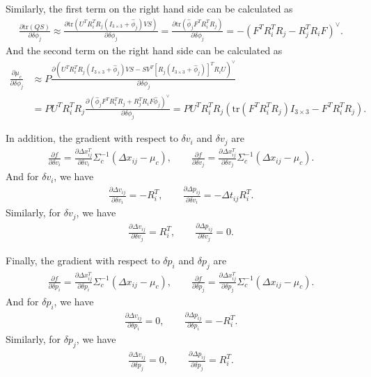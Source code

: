 \documentclass[10pt]{article}
\newcommand{\tr}[1]{\ensuremath{\mathrm{tr}\left( #1 \right)}}
\begin{document}
\color{black}
Similarly, the first term on the right hand side can be calculated as
\begin{align}
	\frac{\partial \tr{QS}}{\partial \delta\phi_j} \approx \frac{\partial \tr{U^TR_i^TR_j(I_{3\times 3}+\hat{\phi}_j)VS}}{\partial \delta\phi_j} = \frac{\partial \tr{\hat{\phi}_jF^TR_i^TR_j}}{\partial \delta\phi_j} = -(F^TR_i^TR_j - R_j^TR_iF)^\vee.
\end{align}
And the second term on the right hand side can be calculated as
\begin{align}
	\frac{\partial \mu_c}{\partial \delta\phi_j} &\approx P\frac{\partial \left(U^TR_i^TR_j(I_{3\times 3}+\hat{\phi}_j)VS - SV^T[R_j(I_{3\times 3}+\hat{\phi}_j)]^TR_iU\right)^\vee}{\partial \delta\phi_j} \nonumber \\
	&= PU^TR_i^TR_j \frac{\partial \left(\hat{\phi}_jF^TR_i^TR_j + R_j^TR_iF\hat{\phi}_j\right)^\vee}{\partial \delta\phi_j} = PU^TR_i^TR_j \left(\tr{F^TR_i^TR_j}I_{3\times 3} - F^TR_i^TR_j\right).
\end{align}

In addition, the gradient with respect to $\delta v_i$ and $\delta v_j$ are
\color{blue}
\begin{align}
	\frac{\partial f}{\partial \delta v_i} = \frac{\partial \Delta x_{ij}^T}{\partial \delta v_i} \Sigma_c^{-1} (\Delta x_{ij}-\mu_c), \qquad \frac{\partial f}{\partial \delta v_j} = \frac{\partial \Delta x_{ij}^T}{\partial \delta v_j} \Sigma_c^{-1} (\Delta x_{ij}-\mu_c).
\end{align}
\color{black}
And for $\delta v_i$, we have
\begin{align}
	\frac{\partial \Delta v_{ij}}{\partial \delta v_i} = -R_i^T, \qquad \frac{\partial \Delta p_{ij}}{\partial \delta v_i} = -\Delta t_{ij} R_i^T.
\end{align}
Similarly, for $\delta v_j$, we have
\begin{align}
	\frac{\partial \Delta v_{ij}}{\partial \delta v_j} = R_i^T, \qquad \frac{\partial \Delta p_{ij}}{\partial \delta v_j} = 0.
\end{align}

Finally, the gradient with respect to $\delta p_i$ and $\delta p_j$ are
\color{blue}
\begin{align}
	\frac{\partial f}{\partial \delta p_i} = \frac{\partial \Delta x_{ij}^T}{\partial \delta p_i} \Sigma_c^{-1} (\Delta x_{ij}-\mu_c), \qquad \frac{\partial f}{\partial \delta p_j} = \frac{\partial \Delta x_{ij}^T}{\partial \delta p_j} \Sigma_c^{-1} (\Delta x_{ij}-\mu_c).
\end{align}
\color{black}
And for $\delta p_i$, we have
\begin{align}
	\frac{\partial \Delta v_{ij}}{\partial \delta p_i} = 0, \qquad \frac{\partial \Delta p_{ij}}{\partial \delta p_i} = -R_i^T.
\end{align}
Similarly, for $\delta p_j$, we have
\begin{align}
	\frac{\partial \Delta v_{ij}}{\partial \delta p_j} = 0, \qquad \frac{\partial \Delta p_{ij}}{\partial \delta p_j} = R_i^T.
\end{align}
\end{document}
